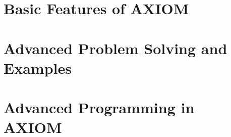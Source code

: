 
\newenvironment{TeXOutput}{}{}
\newenvironment{MessageOutput}{}{}
\newenvironment{SysCmdOutput}{}{}
\newenvironment{inputonly}{}{}


%
%
\setcounter{page}{0}


\newpage\ssectionmark{} %
\tableofcontents

%


%
\part{Basic Features of AXIOM}
%







%
\part{Advanced Problem Solving and Examples}
%


%
\part{Advanced Programming in AXIOM}
%





%
\appendix
%


%
%
%
%

%
%

